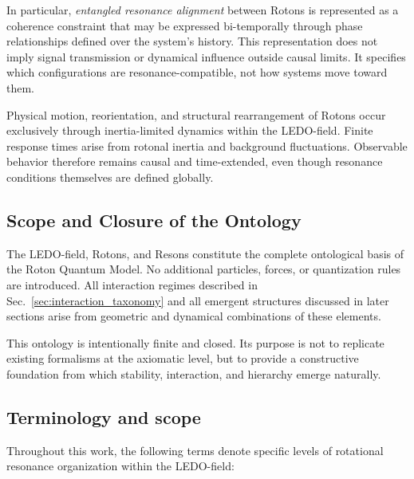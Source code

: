 \documentclass[11pt,a4paper]{article}
\begin{document}
In particular, \emph{entangled resonance alignment} between Rotons is represented as a
coherence constraint that may be expressed bi-temporally through phase relationships
defined over the system’s history.
This representation does not imply signal transmission or dynamical influence outside
causal limits.
It specifies which configurations are resonance-compatible, not how systems move toward
them.

Physical motion, reorientation, and structural rearrangement of Rotons occur exclusively
through inertia-limited dynamics within the LEDO-field.
Finite response times arise from rotonal inertia and background fluctuations.
Observable behavior therefore remains causal and time-extended, even though resonance
conditions themselves are defined globally.

\subsection{Scope and Closure of the Ontology}

The LEDO-field, Rotons, and Resons constitute the complete ontological basis of the Roton
Quantum Model.
No additional particles, forces, or quantization rules are introduced.
All interaction regimes described in Sec.~\ref{sec:interaction_taxonomy} and all emergent
structures discussed in later sections arise from geometric and dynamical combinations of
these elements.

This ontology is intentionally finite and closed.
Its purpose is not to replicate existing formalisms at the axiomatic level, but to provide
a constructive foundation from which stability, interaction, and hierarchy emerge
naturally.


\subsection*{Terminology and scope}

Throughout this work, the following terms denote specific levels of rotational resonance
organization within the LEDO-field:
\end{document}
